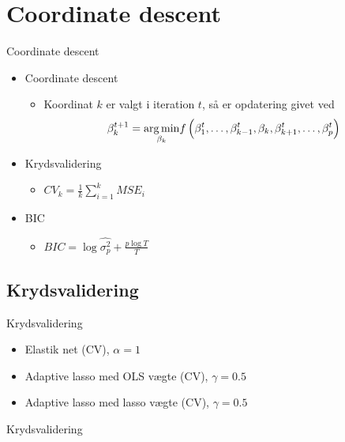 \section{Coordinate descent}
\begin{frame}{Coordinate descent}
\begin{itemize}
\item Coordinate descent
\begin{itemize}
\item Koordinat $k$ er valgt i iteration $t$, så er opdatering givet ved
\begin{align*}
\beta_k^{t+1} = \underset{\beta_k}{\arg\min} f\del{\beta_1^t,\dots, \beta_{k-1}^t, \beta_k, \beta_{k+1}^t, \dots, \beta_p^t }
\end{align*}
\end{itemize}
\item Krydsvalidering
\begin{itemize}
\item $CV_k = \frac{1}{k} \sum_{i=1}^k MSE_i$
\end{itemize}
\item BIC
\begin{itemize}
\item $BIC = \log \widehat{\sigma^2_p} + \frac{p \log T}{T} $
\end{itemize}
\end{itemize}
\end{frame}

\subsection{Krydsvalidering}
\begin{frame}{Krydsvalidering}
\begin{itemize}
\item Elastik net (CV), $\alpha = 1$
\item Adaptive lasso med OLS vægte (CV), $\gamma = 0.5$
\item Adaptive lasso med lasso vægte (CV), $\gamma = 0.5$
\end{itemize}
\end{frame}

\begin{frame}{Krydsvalidering}

\end{frame}

